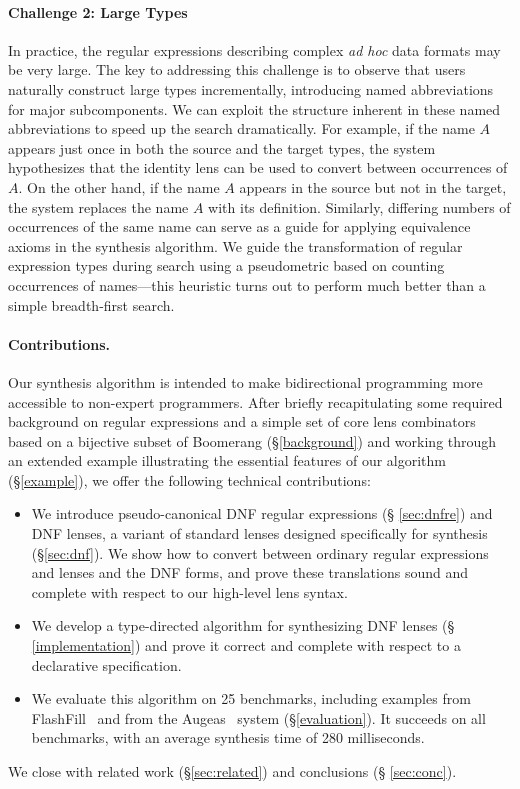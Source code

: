 \documentclass[numbers,10pt,preprint\ifanon ,nocopyrightspace\fi]{sigplanconf}
\begin{document}
\paragraph*{Challenge 2: Large Types}
In practice, the regular expressions describing complex {\em ad hoc} data
formats may be very large.  
%
The key to addressing this challenge is to observe that users naturally
construct large types incrementally, introducing named abbreviations for
major subcomponents.  We can exploit the structure inherent in these named
abbreviations to speed up the search dramatically.  For example, if the name
$A$ appears just once in both the source and the target types, the system
hypothesizes that the identity lens can be used to convert between
occurrences of $A$.  On the other hand, if the name $A$ appears in the
source but not in the target, the system replaces the name $A$ with its
definition.  Similarly, differing numbers of occurrences of the same name
can serve as a guide for applying equivalence axioms in the synthesis
algorithm.  We guide the transformation of regular expression types during
search using a pseudometric based on counting occurrences of names---this
heuristic turns out to perform much better than a simple breadth-first
search.

\paragraph*{Contributions.}  Our synthesis algorithm is intended to make
bidirectional programming more accessible to non-expert programmers.  After
briefly recapitulating some required background on regular expressions and a
simple set of core lens combinators based on a bijective subset of Boomerang
(\S\ref{background}) and working through an extended example illustrating
the essential features of our algorithm (\S\ref{example}), we offer the
following technical contributions:

\begin{itemize}
\item We introduce pseudo-canonical DNF regular expressions (\S
\ref{sec:dnfre}) and DNF lenses, a variant of standard lenses designed
specifically for synthesis (\S \ref{sec:dnf}).  We show how to convert
between ordinary regular expressions and lenses and the DNF forms, and prove
these translations sound and complete with respect to our high-level lens syntax.
\item We develop a type-directed algorithm for synthesizing DNF lenses (\S
\ref{implementation}) and prove it correct and complete with respect
to a declarative specification.

\item We evaluate this algorithm on 25 benchmarks, including examples from
FlashFill~\cite{gulwani-popl-2014} and from the Augeas~\cite{augeas}
system (\S \ref{evaluation}).  It succeeds on
all benchmarks, with an average synthesis time of 280
milliseconds.
\end{itemize}
We close with related work (\S \ref{sec:related}) and conclusions (\S
\ref{sec:conc}). 
\end{document}
